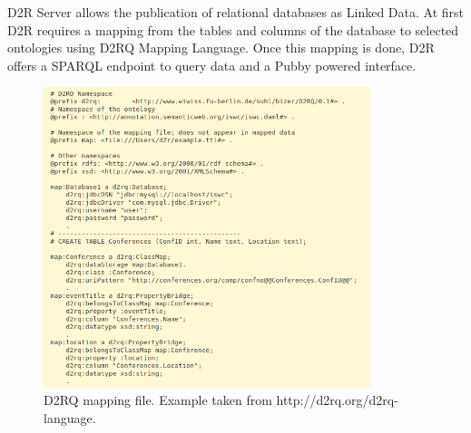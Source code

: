 D2R Server \cite{bizer2006d2r} allows the publication of relational databases as Linked Data. At first D2R requires a mapping from the tables and columns of the database to selected ontologies using D2RQ Mapping Language. Once this mapping is done, D2R offers a SPARQL endpoint to query data and a Pubby powered interface.

\begin{figure}
    \center
    \includegraphics[width=0.85\textwidth]{img/ld_approach/d2rq.png}
    \caption{D2RQ mapping file. Example taken from http://d2rq.org/d2rq-language.}
    \label{fig:d2rq}
\end{figure}

